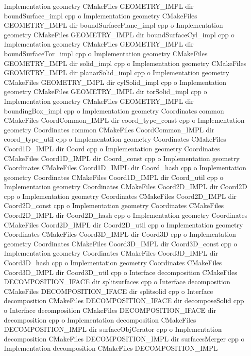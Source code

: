 Implementation geometry C\+Make\+Files G\+E\+O\+M\+E\+T\+R\+Y\+\_\+\+I\+M\+PL dir bound\+Surface\+\_\+impl cpp o Implementation geometry C\+Make\+Files G\+E\+O\+M\+E\+T\+R\+Y\+\_\+\+I\+M\+PL dir bound\+Surface\+Plane\+\_\+impl cpp o Implementation geometry C\+Make\+Files G\+E\+O\+M\+E\+T\+R\+Y\+\_\+\+I\+M\+PL dir bound\+Surface\+Cyl\+\_\+impl cpp o Implementation geometry C\+Make\+Files G\+E\+O\+M\+E\+T\+R\+Y\+\_\+\+I\+M\+PL dir bound\+Surface\+Tor\+\_\+impl cpp o Implementation geometry C\+Make\+Files G\+E\+O\+M\+E\+T\+R\+Y\+\_\+\+I\+M\+PL dir solid\+\_\+impl cpp o Implementation geometry C\+Make\+Files G\+E\+O\+M\+E\+T\+R\+Y\+\_\+\+I\+M\+PL dir planar\+Solid\+\_\+impl cpp o Implementation geometry C\+Make\+Files G\+E\+O\+M\+E\+T\+R\+Y\+\_\+\+I\+M\+PL dir cyl\+Solid\+\_\+impl cpp o Implementation geometry C\+Make\+Files G\+E\+O\+M\+E\+T\+R\+Y\+\_\+\+I\+M\+PL dir tor\+Solid\+\_\+impl cpp o Implementation geometry C\+Make\+Files G\+E\+O\+M\+E\+T\+R\+Y\+\_\+\+I\+M\+PL dir bounding\+Box\+\_\+impl cpp o Implementation geometry Coordinates common C\+Make\+Files Coord\+Common\+\_\+\+I\+M\+PL dir coord\+\_\+type\+\_\+const cpp o Implementation geometry Coordinates common C\+Make\+Files Coord\+Common\+\_\+\+I\+M\+PL dir coord\+\_\+type\+\_\+util cpp o Implementation geometry Coordinates C\+Make\+Files Coord1\+D\+\_\+\+I\+M\+PL dir Coord cpp o Implementation geometry Coordinates C\+Make\+Files Coord1\+D\+\_\+\+I\+M\+PL dir Coord\+\_\+const cpp o Implementation geometry Coordinates C\+Make\+Files Coord1\+D\+\_\+\+I\+M\+PL dir Coord\+\_\+hash cpp o Implementation geometry Coordinates C\+Make\+Files Coord1\+D\+\_\+\+I\+M\+PL dir Coord\+\_\+util cpp o Implementation geometry Coordinates C\+Make\+Files Coord2\+D\+\_\+\+I\+M\+PL dir Coord2D cpp o Implementation geometry Coordinates C\+Make\+Files Coord2\+D\+\_\+\+I\+M\+PL dir Coord2\+D\+\_\+const cpp o Implementation geometry Coordinates C\+Make\+Files Coord2\+D\+\_\+\+I\+M\+PL dir Coord2\+D\+\_\+hash cpp o Implementation geometry Coordinates C\+Make\+Files Coord2\+D\+\_\+\+I\+M\+PL dir Coord2\+D\+\_\+util cpp o Implementation geometry Coordinates C\+Make\+Files Coord3\+D\+\_\+\+I\+M\+PL dir Coord3D cpp o Implementation geometry Coordinates C\+Make\+Files Coord3\+D\+\_\+\+I\+M\+PL dir Coord3\+D\+\_\+const cpp o Implementation geometry Coordinates C\+Make\+Files Coord3\+D\+\_\+\+I\+M\+PL dir Coord3\+D\+\_\+hash cpp o Implementation geometry Coordinates C\+Make\+Files Coord3\+D\+\_\+\+I\+M\+PL dir Coord3\+D\+\_\+util cpp o Interface decomposition C\+Make\+Files D\+E\+C\+O\+M\+P\+O\+S\+I\+T\+I\+O\+N\+\_\+\+I\+F\+A\+CE dir splitsurfaces cpp o Interface decomposition C\+Make\+Files D\+E\+C\+O\+M\+P\+O\+S\+I\+T\+I\+O\+N\+\_\+\+I\+F\+A\+CE dir splitsolid cpp o Interface decomposition C\+Make\+Files D\+E\+C\+O\+M\+P\+O\+S\+I\+T\+I\+O\+N\+\_\+\+I\+F\+A\+CE dir decompose\+Solid cpp o Interface decomposition C\+Make\+Files D\+E\+C\+O\+M\+P\+O\+S\+I\+T\+I\+O\+N\+\_\+\+I\+F\+A\+CE dir decomposition cpp o Implementation decomposition C\+Make\+Files D\+E\+C\+O\+M\+P\+O\+S\+I\+T\+I\+O\+N\+\_\+\+I\+M\+PL dir surface\+Obj\+Cerator cpp o Implementation decomposition C\+Make\+Files D\+E\+C\+O\+M\+P\+O\+S\+I\+T\+I\+O\+N\+\_\+\+I\+M\+PL dir surfaces\+Merger cpp o Implementation decomposition C\+Make\+Files D\+E\+C\+O\+M\+P\+O\+S\+I\+T\+I\+O\+N\+\_\+\+I\+M\+PL 